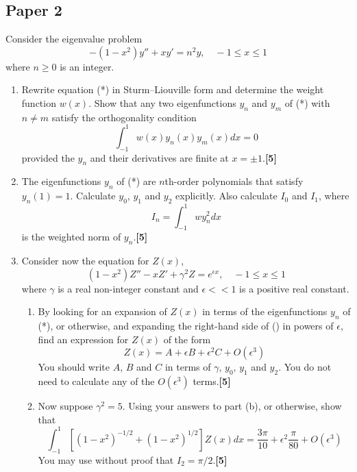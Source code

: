 \documentclass[a4paper]{article}
\begin{document}
\subsection{Paper 2}
\begin{qns}
Consider the eigenvalue problem
\begin{equation}
    -(1-x^2)y''+xy'=n^2y,\quad-1\leq x\leq 1\tag{*}
\end{equation}
where $n\geq 0$ is an integer.
\begin{enumerate}[label=(\alph*)]
\item Rewrite equation (*) in Sturm–Liouville form and determine the weight function $w(x)$. Show that any two eigenfunctions $y_n$ and $y_m$ of (*) with $n\neq m$ satisfy the orthogonality condition 
$$\int_{-1}^1w(x)y_n(x)y_m(x)dx=0$$
provided the $y_n$ and their derivatives are finite at $x = \pm1$.\hfill\textbf{[5]}
\item 
The eigenfunctions $y_n$ of (*) are $n$th-order polynomials that satisfy $y_n(1) = 1$. Calculate $y_0$, $y_1$ and $y_2$ explicitly. Also calculate $I_0$ and $I_1$, where
$$I_n=\int_{-1}^1wy_n^2dx$$
is the weighted norm of $y_n$.\hfill\textbf{[5]}
\item Consider now the equation for $Z(x)$,
\begin{equation}
    (1-x^2)Z''-xZ'+\gamma^2Z=e^{\epsilon x},\quad -1\leq x\leq 1\tag{\dag}
\end{equation}
where $\gamma$ is a real non-integer constant and $\epsilon<<1$ is a positive real constant.
\begin{enumerate}[label=(\roman*)]
\item
By looking for an expansion of $Z(x)$ in terms of the eigenfunctions $y_n$ of (*), or otherwise, and expanding the right-hand side of (\dag) in powers of $\epsilon$, find an expression for $Z(x)$ of the form
$$Z(x)=A+\epsilon B+\epsilon^2C+O(\epsilon^3)$$
You should write $A$, $B$ and $C$ in terms of $\gamma$, $y_0$, $y_1$ and $y_2$. You do not need to calculate any of the $O(\epsilon^3)$ terms.\hfill\textbf{[5]}
\item Now suppose $\gamma^2=5$. Using your answers to part (b), or otherwise, show that
$$\int_{-1}^1[(1-x^2)^{-1/2}+(1-x^2)^{1/2}]Z(x)dx=\frac{3\pi}{10}+\epsilon^2\frac{\pi}{80}+O(\epsilon^3)$$
You may use without proof that $I_2=\pi/2$.\hfill\textbf{[5]}
\end{enumerate}
\end{enumerate}
\end{qns}
\end{document}
